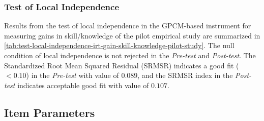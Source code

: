 \subsubsection*{Test of Local Independence}

Results from the test of local independence in the GPCM-based instrument for measuring gains in skill/knowledge of the pilot empirical study are summarized in \autoref{tab:test-local-independence-irt-gain-skill-knowledge-pilot-study}.
The null condition of local independence is not rejected in the \emph{Pre-test} and \emph{Post-test}.
The Standardized Root Mean Squared Residual (SRMSR) indicates a good fit ($< 0.10$) in the \emph{Pre-test} with value of $0.089$, and the SRMSR index in the \emph{Post-test} indicates acceptable good fit with value of $0.107$.


\subsection{Item Parameters}

